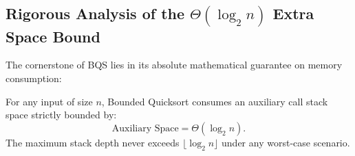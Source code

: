 \FloatBarrier

\subsection{Rigorous Analysis of the \texorpdfstring{$\Theta(\log_2 n)$}{Theta(log n)} Extra Space Bound}
\label{subsec:bqs-space-analysis}

The cornerstone of BQS lies in its absolute mathematical guarantee on memory consumption:

\begin{theorem}
\label{thm:bqs-space-guarantee}
For any input of size $n$, Bounded Quicksort consumes an auxiliary call stack space strictly bounded by:
\begin{equation}
  \text{Auxiliary Space} = \Theta(\log_2 n).
\end{equation}
The maximum stack depth never exceeds $\lfloor \log_2 n \rfloor$ under any worst-case scenario.
\end{theorem}


